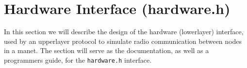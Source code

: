 \section{Hardware Interface (hardware.h)}\label{sec:hardwareinterface}
In this section we will describe the design of the hardware (\gls{lowerlayer}) interface, used by an \gls{upperlayer} protocol to simulate radio communication between nodes in a \gls{manet}. The section will serve as the documentation, as well as a programmers guide, for the \texttt{hardware.h} interface.


